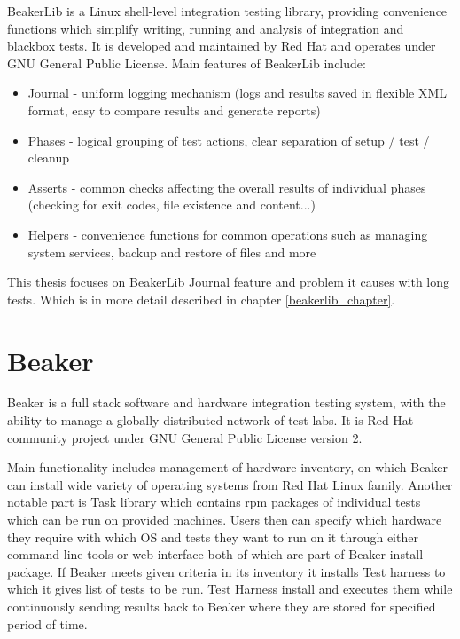 BeakerLib is a Linux shell-level integration testing library, providing convenience functions which simplify writing, running and analysis of integration and blackbox tests. \cite{beakerlib_wiki}
It is developed and maintained by Red Hat and operates under GNU General Public License.
Main features of BeakerLib include:
\begin{itemize}
\item Journal - uniform logging mechanism (logs and results saved in flexible XML format, easy to compare results and generate reports)
\item Phases - logical grouping of test actions, clear separation of setup / test / cleanup
\item Asserts - common checks affecting the overall results of individual phases (checking for exit codes, file existence and content...)
\item Helpers - convenience functions for common operations such as managing system services, backup and restore of files and more
\end{itemize}


This thesis focuses on BeakerLib Journal feature and problem it causes with long tests. Which is in more detail described in chapter \ref{beakerlib_chapter}.


\section{Beaker}

Beaker\cite{beaker_doc} is a full stack software and hardware integration testing system, with the ability to manage a globally distributed network of test labs.  It is Red Hat community project under GNU General Public License version 2.

Main functionality includes management of hardware inventory, on which Beaker can install wide variety  of operating systems from Red Hat Linux family. Another notable part  is Task library which contains rpm packages of individual tests which can be run on provided machines. 
Users then can specify which hardware they require with which OS and tests they want to run on it through either command-line tools or web interface both of which are part of Beaker install package. If Beaker meets given criteria in its inventory it installs Test harness to which it gives list of tests to be run.  Test Harness install and executes them while continuously sending results back to Beaker where they are stored for specified period of time. 

